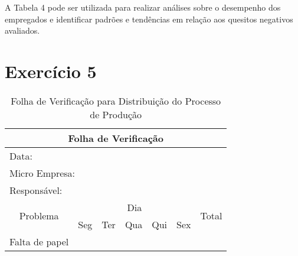 \documentclass{article}
\begin{document}
A Tabela 4 pode ser utilizada para realizar análises sobre o desempenho dos empregados e identificar padrões e tendências em relação aos quesitos negativos avaliados.

\section*{Exercício 5}

\begin{table}[h!]
\centering
\caption{Folha de Verificação para Distribuição do Processo de Produção}
\begin{tabular}{|lllllll|}
\hline
\multicolumn{7}{|c|}{Folha de Verificação}                                                                                                                                                                                           \\ \hline
\multicolumn{7}{|l|}{Data:}                                                                                                                                                                                                          \\ \hline
\multicolumn{7}{|l|}{Micro Empresa:}                                                                                                                                                                                                 \\ \hline
\multicolumn{1}{|l|}{Responsável:}              & \multicolumn{6}{l|}{}                                                                                                                                                              \\ \hline
\multicolumn{1}{|c|}{\multirow{2}{*}{Problema}} & \multicolumn{5}{c|}{Dia}                                                                                                             & \multicolumn{1}{c|}{\multirow{2}{*}{Total}} \\ \cline{2-6}
\multicolumn{1}{|c|}{}                          & \multicolumn{1}{c|}{Seg} & \multicolumn{1}{c|}{Ter} & \multicolumn{1}{c|}{Qua} & \multicolumn{1}{c|}{Qui} & \multicolumn{1}{c|}{Sex} & \multicolumn{1}{c|}{}                       \\ \hline
\multicolumn{1}{|l|}{Falta de papel}            & \multicolumn{1}{l|}{}    & \multicolumn{1}{l|}{}    & \multicolumn{1}{l|}{}    & \multicolumn{1}{l|}{}    & \multicolumn{1}{l|}{}    &                                             \\ \hline

\end{tabular}
\end{table}
\end{document}
